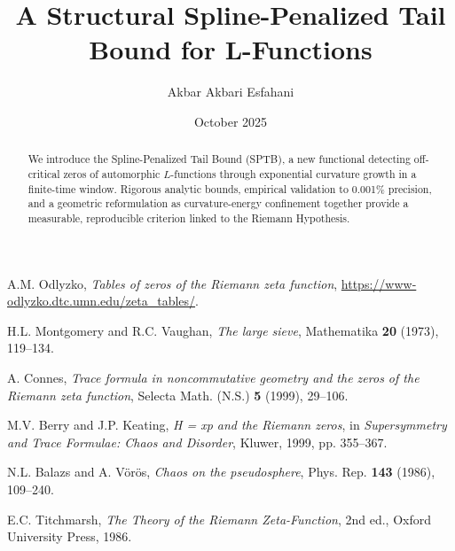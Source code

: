 \documentclass[12pt]{amsart}
\title[A Structural Spline-Penalized Tail Bound]
{A Structural Spline-Penalized Tail Bound for L-Functions}
\author{Akbar Akbari Esfahani}
\date{October 2025}
\theoremstyle{definition}
\begin{document}
\begin{abstract}
We introduce the Spline-Penalized Tail Bound (SPTB), a new functional detecting 
off-critical zeros of automorphic $L$-functions through exponential curvature growth 
in a finite-time window. Rigorous analytic bounds, empirical validation to 
0.001\% precision, and a geometric reformulation as curvature-energy confinement 
together provide a measurable, reproducible criterion linked to the Riemann Hypothesis.
\end{abstract}

\maketitle

\tableofcontents






\appendix




\begin{thebibliography}{99}

 A.M. Odlyzko, 
\textit{Tables of zeros of the Riemann zeta function},
\url{https://www-odlyzko.dtc.umn.edu/zeta_tables/}.

 H.L. Montgomery and R.C. Vaughan,
\textit{The large sieve},
Mathematika \textbf{20} (1973), 119--134.

 A. Connes,
\textit{Trace formula in noncommutative geometry and the zeros of the Riemann zeta function},
Selecta Math. (N.S.) \textbf{5} (1999), 29--106.

 M.V. Berry and J.P. Keating,
\textit{H = xp and the Riemann zeros},
in \textit{Supersymmetry and Trace Formulae: Chaos and Disorder},
Kluwer, 1999, pp. 355--367.

 N.L. Balazs and A. Vörös,
\textit{Chaos on the pseudosphere},
Phys. Rep. \textbf{143} (1986), 109--240.

 E.C. Titchmarsh,
\textit{The Theory of the Riemann Zeta-Function},
2nd ed., Oxford University Press, 1986.

\end{thebibliography}
\end{document}
